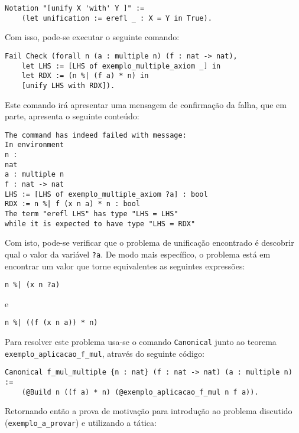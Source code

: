 {{\begin{lstlisting}[language = coq,frame=single,tabsize=1]
Notation "[unify X 'with' Y ]" := 
    (let unification := erefl _ : X = Y in True).
    \end{lstlisting} 
Com isso, pode-se executar o seguinte comando:
    \begin{lstlisting}[language = coq,frame=single,tabsize=1]
Fail Check (forall n (a : multiple n) (f : nat -> nat),
    let LHS := [LHS of exemplo_multiple_axiom _] in
    let RDX := (n %| (f a) * n) in
    [unify LHS with RDX]).
    \end{lstlisting}
Este comando irá apresentar uma mensagem de confirmação da falha, que em parte, apresenta o seguinte conteúdo:
    \begin{lstlisting}[language = coq-error,frame=single,tabsize=1]
The command has indeed failed with message:
In environment
n :
nat
a : multiple n
f : nat -> nat
LHS := [LHS of exemplo_multiple_axiom ?a] : bool
RDX := n %| f (x n a) * n : bool
The term "erefl LHS" has type "LHS = LHS"
while it is expected to have type "LHS = RDX"
    \end{lstlisting} 
Com isto, pode-se verificar que o problema de unificação encontrado é descobrir qual o valor da variável \lstinline[language = coq]!?a!. De modo mais específico, o problema está em encontrar um valor que torne equivalentes as seguintes expressões:
    \begin{lstlisting}[language = coq,frame=single,tabsize=1]
n %| (x n ?a)
    \end{lstlisting} 
e
    \begin{lstlisting}[language = coq,frame=single,tabsize=1]
n %| ((f (x n a)) * n)
    \end{lstlisting}
 Para resolver este problema %
 usa-se o comando \lstinline[language = coq]!Canonical! junto ao teorema\\ 
 \lstinline[language = coq]!exemplo_aplicacao_f_mul!, através do seguinte código:
    \begin{lstlisting}[language = coq,frame=single,tabsize=1]
Canonical f_mul_multiple {n : nat} (f : nat -> nat) (a : multiple n) := 
    (@Build n ((f a) * n) (@exemplo_aplicacao_f_mul n f a)).
    \end{lstlisting} 
    Retornando então a prova de motivação para introdução ao problema discutido\\
    (\lstinline[language = coq]!exemplo_a_provar!) e utilizando a tática:
    \begin{lstlisting}[language = coq,frame=single,tabsize=1]

\end{lstlisting}}}
